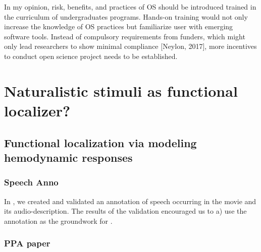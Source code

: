 
In my opinion, risk, benefits, and practices of OS should be introduced trained
in the curriculum of undergraduates programs.
%
Hands-on training would not only increase the knowledge of OS practices but
familiarize user with emerging software tools.
%
Instead of compulsory requirements from funders, which might only lead
researchers to show minimal compliance [Neylon, 2017], more incentives to
conduct open science project needs to be established.


\pagebreak



\section{Naturalistic stimuli as functional localizer?}



\subsection{Functional localization via modeling hemodynamic responses}




\subsubsection{Speech Anno}


In \citep{haeusler2021speechanno}, we created and validated an annotation of
speech occurring in the movie and its audio-description.
The results of the validation encouraged us to a) use the annotation as the
groundwork for \citep{haeusler2022processing}.

\subsubsection{PPA paper}



